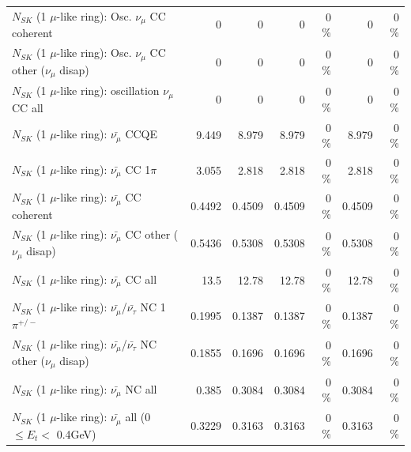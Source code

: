 \begin{table}
\begin{tabular}{| l | r | r | r  r | r  r |}
                        $N_{SK}$ (1 $\mu$-like ring): Osc. $\nu_\mu$ CC coherent &               0 &               0 &               0 &        0 \%  &               0 &        0 \%  \\ 
         $N_{SK}$ (1 $\mu$-like ring): Osc. $\nu_\mu$ CC other ($\nu_\mu$ disap) &               0 &               0 &               0 &        0 \%  &               0 &        0 \%  \\ 
                      $N_{SK}$ (1 $\mu$-like ring): oscillation $\nu_\mu$ CC all &               0 &               0 &               0 &        0 \%  &               0 &        0 \%  \\ 
\hline
\hline
                              $N_{SK}$ (1 $\mu$-like ring): $\bar{\nu_\mu}$ CCQE &           9.449 &           8.979 &           8.979 &        0 \%  &           8.979 &        0 \%  \\ 
                         $N_{SK}$ (1 $\mu$-like ring): $\bar{\nu_\mu}$ CC 1$\pi$ &           3.055 &           2.818 &           2.818 &        0 \%  &           2.818 &        0 \%  \\ 
                       $N_{SK}$ (1 $\mu$-like ring): $\bar{\nu_\mu}$ CC coherent &          0.4492 &          0.4509 &          0.4509 &        0 \%  &          0.4509 &        0 \%  \\ 
        $N_{SK}$ (1 $\mu$-like ring): $\bar{\nu_\mu}$ CC other ($\nu_\mu$ disap) &          0.5436 &          0.5308 &          0.5308 &        0 \%  &          0.5308 &        0 \%  \\ 
                          $N_{SK}$ (1 $\mu$-like ring): $\bar{\nu_{\mu}}$ CC all &            13.5 &           12.78 &           12.78 &        0 \%  &           12.78 &        0 \%  \\ 
\hline
  $N_{SK}$ (1 $\mu$-like ring): $\bar{\nu_\mu}$/$\bar{\nu_\tau}$ NC 1$\pi^{+/-}$ &          0.1995 &          0.1387 &          0.1387 &        0 \%  &          0.1387 &        0 \%  \\ 
$N_{SK}$ (1 $\mu$-like ring): $\bar{\nu_\mu}$/$\bar{\nu_\tau}$ NC other ($\nu_\mu$ disap) &          0.1855 &          0.1696 &          0.1696 &        0 \%  &          0.1696 &        0 \%  \\ 
                          $N_{SK}$ (1 $\mu$-like ring): $\bar{\nu_{\mu}}$ NC all &           0.385 &          0.3084 &          0.3084 &        0 \%  &          0.3084 &        0 \%  \\ 
\hline
   $N_{SK}$ (1 $\mu$-like ring): $\bar{\nu_{\mu}}$ all (0 $\leq E_{t} <$ 0.4GeV) &          0.3229 &          0.3163 &          0.3163 &        0 \%  &          0.3163 &        0 \%  \\ 

\end{tabular}
\end{table}
